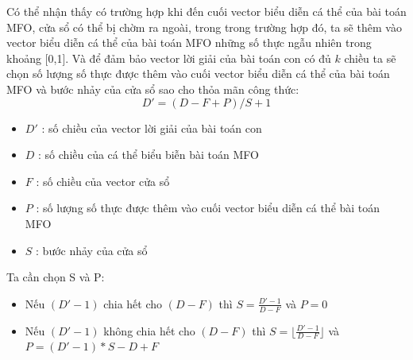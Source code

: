 \documentclass[a4paper,12pt]{report}
\begin{document}
\par Có thể nhận thấy có trường hợp khi đến cuối vector biểu diễn cá thể của bài toán MFO, cửa sổ có thể bị chờm ra ngoài, trong trong trường hợp đó, ta sẽ thêm vào vector biểu diễn cá thể của bài toán MFO những số thực ngẫu nhiên trong khoảng [0,1]. Và để đảm bảo vector lời giải của bài toán con có đủ $k$ chiều ta sẽ chọn số lượng số thực được thêm vào cuối vector biểu diễn cá thể của bài toán MFO và bước nhảy của cửa sổ sao cho thỏa mãn công thức:  
$$D' = (D-F+P)/S + 1$$
\begin{itemize}
\item $D'$ : số chiều của vector lời giải của bài toán con
\item $D$ : số chiều của cá thể biểu biễn bài toán MFO 
\item $F$ : số chiều của vector cửa sổ 
\item $P$ : số lượng số thực được thêm vào cuối vector biểu diễn cá thể bài toán MFO
\item $S$ : bước nhảy của cửa sổ   
\end{itemize}
\par Ta cần chọn S và P:
\begin{itemize}
\item Nếu $(D'-1)$ chia hết cho $(D-F)$ thì $S = \frac{D'-1}{D-F}$ và $P=0$
\item Nếu $(D'-1)$ không chia hết cho $(D-F)$ thì $S =  \lfloor \frac{D'-1}{D-F} \rfloor$  và $P = (D'-1)*S - D + F$ 
\end{itemize}
\end{document}
